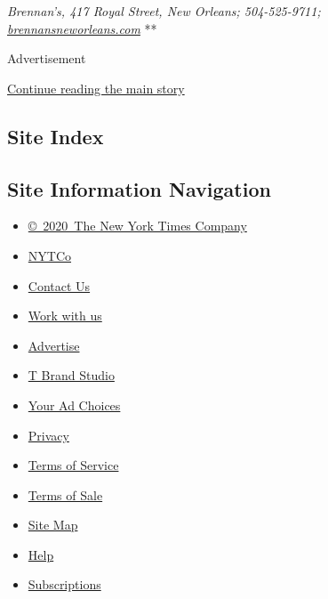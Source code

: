 \emph{Brennan's, 417 Royal Street, New Orleans; 504-525-9711;}
\href{http://brennansneworleans.com/}{\emph{brennansneworleans.com}} **

Advertisement

\protect\hyperlink{after-bottom}{Continue reading the main story}

\hypertarget{site-index}{%
\subsection{Site Index}\label{site-index}}

\hypertarget{site-information-navigation}{%
\subsection{Site Information
Navigation}\label{site-information-navigation}}

\begin{itemize}
\tightlist
\item
  \href{https://help.nytimes3xbfgragh.onion/hc/en-us/articles/115014792127-Copyright-notice}{©~2020~The
  New York Times Company}
\end{itemize}

\begin{itemize}
\tightlist
\item
  \href{https://www.nytco.com/}{NYTCo}
\item
  \href{https://help.nytimes3xbfgragh.onion/hc/en-us/articles/115015385887-Contact-Us}{Contact
  Us}
\item
  \href{https://www.nytco.com/careers/}{Work with us}
\item
  \href{https://nytmediakit.com/}{Advertise}
\item
  \href{http://www.tbrandstudio.com/}{T Brand Studio}
\item
  \href{https://www.nytimes3xbfgragh.onion/privacy/cookie-policy\#how-do-i-manage-trackers}{Your
  Ad Choices}
\item
  \href{https://www.nytimes3xbfgragh.onion/privacy}{Privacy}
\item
  \href{https://help.nytimes3xbfgragh.onion/hc/en-us/articles/115014893428-Terms-of-service}{Terms
  of Service}
\item
  \href{https://help.nytimes3xbfgragh.onion/hc/en-us/articles/115014893968-Terms-of-sale}{Terms
  of Sale}
\item
  \href{https://spiderbites.nytimes3xbfgragh.onion}{Site Map}
\item
  \href{https://help.nytimes3xbfgragh.onion/hc/en-us}{Help}
\item
  \href{https://www.nytimes3xbfgragh.onion/subscription?campaignId=37WXW}{Subscriptions}
\end{itemize}
